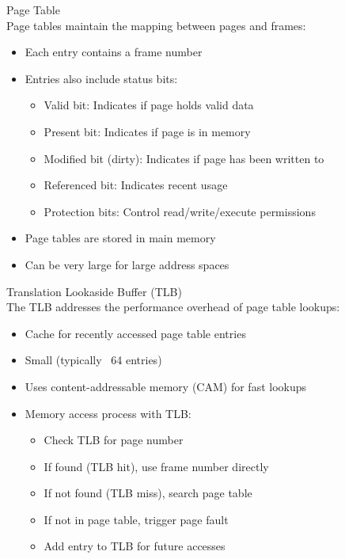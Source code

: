 \begin{definition}{Page Table}\\
    Page tables maintain the mapping between pages and frames:
    \begin{itemize}
        \item Each entry contains a frame number
        \item Entries also include status bits:
            \begin{itemize}
                \item Valid bit: Indicates if page holds valid data
                \item Present bit: Indicates if page is in memory
                \item Modified bit (dirty): Indicates if page has been written to
                \item Referenced bit: Indicates recent usage
                \item Protection bits: Control read/write/execute permissions
            \end{itemize}
        \item Page tables are stored in main memory
        \item Can be very large for large address spaces
    \end{itemize}
\end{definition}

\begin{definition}{Translation Lookaside Buffer (TLB)}\\
    The TLB addresses the performance overhead of page table lookups:
    \begin{itemize}
        \item Cache for recently accessed page table entries
        \item Small (typically ~64 entries)
        \item Uses content-addressable memory (CAM) for fast lookups
        \item Memory access process with TLB:
            \begin{itemize}
                \item Check TLB for page number
                \item If found (TLB hit), use frame number directly
                \item If not found (TLB miss), search page table
                \item If not in page table, trigger page fault
                \item Add entry to TLB for future accesses
            \end{itemize}
    \end{itemize}
\end{definition}

